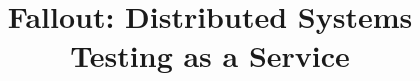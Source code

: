 \documentclass[a4paper,fleqn]{cas-dc}
\begin{document}
\let\WriteBookmarks\relax
\def\floatpagepagefraction{1}
\def\textpagefraction{.001}



\title [mode = title]{Fallout: Distributed Systems Testing as a Service}  



%














\end{document}
